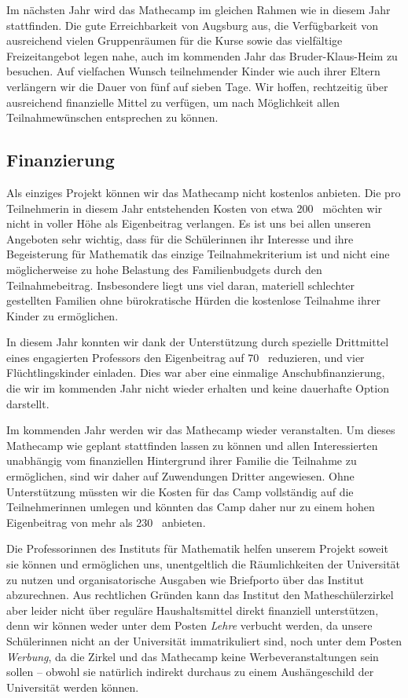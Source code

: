 \documentclass[12pt]{zettel}
\newcommand{\twopics}[2]{%
  \begin{figure}[b]%
    \vspace*{0.5cm}%
    \makebox[\textwidth][c]{%
      \texttt{[image: impressionen/\#1]}%
      \hspace*{1cm}%
      \texttt{[image: impressionen/\#2]}%
    }%
    \vspace*{-1cm}%
  \end{figure}
}
\begin{document}
Im nächsten Jahr wird das Mathecamp im gleichen Rahmen wie in diesem Jahr stattfinden. Die gute Erreichbarkeit von Augsburg aus, die Verfügbarkeit von ausreichend vielen
Gruppenräumen für die Kurse sowie das vielfältige Freizeitangebot legen nahe, auch im kommenden Jahr das Bruder-Klaus-Heim zu besuchen. Auf vielfachen Wunsch teilnehmender Kinder wie
auch ihrer Eltern verlängern wir die Dauer von fünf auf sieben Tage. Wir hoffen, rechtzeitig über ausreichend finanzielle Mittel zu verfügen, um nach Möglichkeit allen
Teilnahmewünschen entsprechen zu können.


\subsection{Finanzierung}

Als einziges Projekt können wir das Mathecamp nicht kostenlos anbieten. Die pro Teilnehmerin in diesem
Jahr entstehenden Kosten von etwa 200~\texteuro{} möchten wir nicht in voller Höhe als Eigenbeitrag verlangen. Es ist uns bei allen unseren Angeboten sehr wichtig, dass für die
Schülerinnen ihr Interesse und ihre Begeisterung für Mathematik das einzige Teilnahmekriterium ist und nicht eine möglicherweise zu hohe Belastung des Familienbudgets durch den
Teilnahmebeitrag. Insbesondere liegt uns viel daran, materiell schlechter gestellten Familien ohne bürokratische Hürden die kostenlose Teilnahme ihrer Kinder zu ermöglichen.

\twopics{klein-10}{klein-03}

In diesem Jahr konnten wir dank der Unterstützung durch
spezielle Drittmittel eines engagierten Professors den Eigenbeitrag auf
70~\texteuro{} reduzieren, und vier Flüchtlingskinder einladen. Dies war aber
eine einmalige Anschubfinanzierung, die wir im kommenden Jahr nicht wieder
erhalten und keine dauerhafte Option darstellt.

Im kommenden Jahr werden wir das Mathecamp wieder veranstalten. Um dieses Mathecamp wie geplant
stattfinden lassen zu können und allen Interessierten unabhängig vom
finanziellen Hintergrund ihrer Familie die Teilnahme zu ermöglichen, sind wir daher auf Zuwendungen
Dritter angewiesen. Ohne Unterstützung müssten wir die Kosten für das Camp vollständig auf die Teilnehmerinnen umlegen und könnten das Camp daher nur zu einem hohen Eigenbeitrag von mehr als 230~\texteuro{} anbieten.

Die Professorinnen des Instituts für Mathematik helfen unserem Projekt soweit sie können
und ermöglichen uns, unentgeltlich die Räumlichkeiten der Universität zu nutzen
und organisatorische Ausgaben wie Briefporto über das Institut abzurechnen.
Aus rechtlichen Gründen kann das Institut den Matheschülerzirkel aber leider nicht
über reguläre Haushaltsmittel direkt finanziell unterstützen, denn wir können weder unter dem Posten
\emph{Lehre} verbucht werden, da unsere Schülerinnen nicht an der Universität
immatrikuliert sind, noch unter dem Posten \emph{Werbung}, da die Zirkel und
das Mathecamp keine Werbeveranstaltungen sein sollen -- obwohl sie natürlich indirekt
durchaus zu einem Aushängeschild der Universität werden können.
\end{document}
